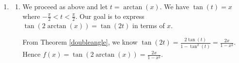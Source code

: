 \documentclass{ximera}
\begin{document}
\begin{example}
\begin{explanation}
\begin{enumerate}
\begin{enumerate}
\begin{image}
\end{image}
 

We find $r = \sqrt{x^2+y^2} = \sqrt{(3)^2+(-4)^2} = 5$, so $\sin(t) = -\frac{4}{5}$.  Hence, $\sin\left(\arctan\left(-\frac{4}{3}\right)\right) = -\frac{4}{5}$.

\end{enumerate}

\item  

\begin{enumerate}

\item We proceed as above and let $t = \arctan(x)$.  We have $\tan(t) = x$ where $-\frac{\pi}{2} < t < \frac{\pi}{2}$.   Our goal is to express  $\tan(2 \arctan(x)) = \tan(2t)$ in terms of $x$.  

 

From Theorem \ref{doubleangle}, we know  $\tan(2t) = \frac{2 \tan(t)}{1 - \tan^{2}(t)} = \frac{2x}{1-x^2}$.  Hence $f(x) = \tan(2 \arctan(x)) = \frac{2x}{1-x^2}$.   


\end{enumerate}
\end{enumerate}
\end{explanation}
\end{example}
\end{document}
